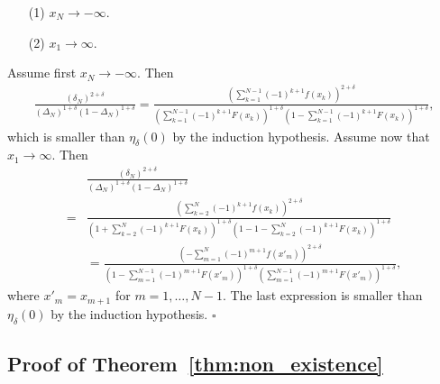 \documentclass[letterpaper, 11pt]{IEEEtran}      %
\newcommand*{\QEDA}{\hfill\ensuremath{\square}}
\begin{document}
\begin{itemize}
\item[(1)]  $x_N \to -\infty$.
\item[(2)] $x_1 \to \infty$.
\end{itemize}
Assume first $x_N \rightarrow -\infty$. Then 
\begin{align*}
\frac{ \left( \delta_N \right)^{2+\delta}} 
{\left(\Delta_N \right)^{1+\delta}\left(1- \Delta_N \right)^{1+\delta}  }
 = \frac{ \left(  \sum_{k=1}^{N-1} (-1)^{k+1}f(x_k) \right)^{2+\delta}} 
{\left( \sum_{k=1}^{N-1} (-1)^{k+1} F(x_k) \right)^{1+\delta}\left(1- \sum_{k=1}^{N-1} (-1)^{k+1} F(x_k)  \right)^{1+\delta} } ,
\end{align*}
which is smaller than $\eta_\delta(0)$ by the induction hypothesis. Assume now that $x_1 \rightarrow \infty$. Then 
\begin{align*}
& \frac{ \left( \delta_N \right)^{2+\delta}} 
{\left(\Delta_N \right)^{1+\delta}\left(1- \Delta_N \right)^{1+\delta}  } \\
=
& \frac{ \left(  \sum_{k=2}^{N} (-1)^{k+1}f(x_k) \right)^{2+\delta}} 
{\left( 1 + \sum_{k=2}^{N} (-1)^{k+1} F(x_k) \right)^{1+\delta}\left(1- 1 - \sum_{k=2}^{N} (-1)^{k+1} F(x_k)  \right)^{1+\delta} }  \\
& = \frac{ \left(  -\sum_{m=1}^{N} (-1)^{m+1}f(x'_m) \right)^{2+\delta}} 
{\left( 1 - \sum_{m=1}^{N-1} (-1)^{m+1} F(x'_{m}) \right)^{1+\delta}\left( \sum_{m=1}^{N-1} (-1)^{m+1} F(x'_{m})  \right)^{1+\delta} },
\end{align*}
where $x'_{m} = x_{m+1}$ for $m=1,\ldots, N-1$. The last expression is smaller than $\eta_{\delta}(0)$ by the induction hypothesis.  \QEDA \\


\subsection{Proof of Theorem~\ref{thm:non_existence}
\label{proof:thm:non_existence}
}
\end{document}

